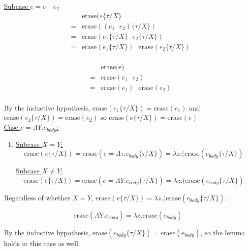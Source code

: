 \documentclass[10pt]{article}
\begin{document}
\begin{exercise}
\begin{enumerate}[\hspace{20pt}]
	\underline{Subcase $e = e_1 \text{ } e_2$}\\
	\begin{eqnarray*}
		& & \text{erase}(e\{\tau / X\} \\
		& = & \text{erase}((e_1 \text{ } e_2) \{\tau / X \})\\
		& = & \text{erase}(e_1\{\tau / X\} \text{ } e_2\{\tau / X\}) \\
		& = & \text{erase}(e_1\{\tau / X\}) \text{ } \text{erase}(e_2\{\tau / X\}) \\
	\end{eqnarray*}
	
	\begin{eqnarray*}
		& & \text{erase(e)} \\
		& = & \text{erase}(e_1 \text{ } e_2) \\
		& = & \text{erase}(e_1) \text{ } \text{erase}(e_2) \\
	\end{eqnarray*}
	
	By the inductive hypothesis, $\text{erase}(e_1\{\tau / X\}) = \text{erase}(e_1)$ 
	and $\text{erase}(e_2\{\tau / X\}) = \text{erase}(e_2)$ so 
	$\text{erase}(e\{\tau / X\}) = \text{erase}(e)$ \checkmark \\
	
	\underline{Case $e = \Lambda Y.e_{body}$:} \\
	
	\begin{enumerate}[\hspace{20pt}]
		\item 
		\underline{Subcase $X = Y$:} \\
		$$\text{erase}(e\{\tau / X\}) = \text{erase}(e = \Lambda \tau.e_{body}\{\tau / 
		X\}) = \lambda z. (\text{erase}(e_{body}\{\tau / X\})$$
		
		\underline{Subcase $X \neq Y$:} \\
		$$\text{erase}(e\{\tau / X\}) = \text{erase}(e = \Lambda Y.e_{body}\{\tau / 
		X\}) = \lambda z. (\text{erase}(e_{body}\{\tau / X\})$$
	\end{enumerate}
	
	Regardless of whether $X = Y$, $\text{erase}(e\{\tau / X\}) = \lambda z. 
	(\text{erase}(e_{body}\{\tau / X\})$.
	
	$$\text{erase}(\Lambda Y.e_{body}) = \lambda z.\text{erase}(e_{body})$$
	
	By the inductive hypothesis, $\text{erase}(e_{body}\{\tau / X\}) = \text{erase}
	(e_{body})$, so the lemma holds in this case as well. \checkmark \\
	

\end{enumerate}
\end{exercise}
\end{document}
